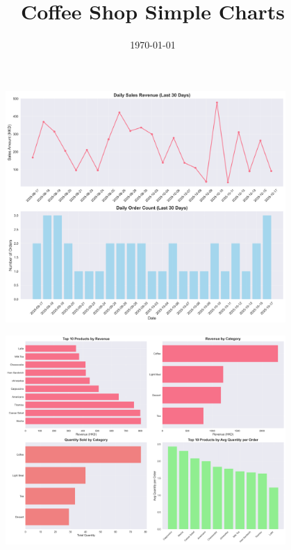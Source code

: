 \documentclass[11pt,a4paper]{article}
\title{Coffee Shop Simple Charts}
\date{\today}
\begin{document}
\maketitle

\begin{figure}[h]
\centering
\includegraphics[width=0.95\textwidth]{../charts/sales_trends.png}
\end{figure}

\begin{figure}[h]
\centering
\includegraphics[width=0.95\textwidth]{../charts/product_performance.png}
\end{figure}
\end{document}
